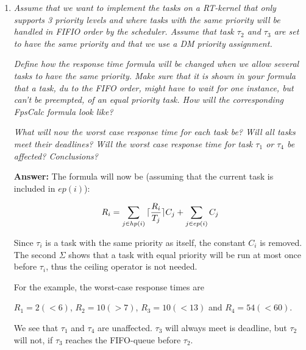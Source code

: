 \documentclass[a4paper,10pt]{article}
\DeclarePairedDelimiter{\ceil}{\lceil}{\rceil}
\newcommand{\answer}{\textbf{Answer: }}
\begin{document}
\begin{enumerate}
\begin{lstlisting}
	$R_1 = 2 (< 6)$, $R_2 = 10 (> 7)$, $R_3 = 7 (< 13)$ and $R_4 = 54 (< 60)$.
	The FpsCalc definition file used to calculate this is the same as the previous, except that the priorities have been exchanged as follows:

        \begin{lstlisting}
          Priovar[A] = 1;
          Priovar[B] = 3;
          Priovar[C] = 2;
          Priovar[D] = 4;
        \end{lstlisting}
	
	\item \emph{Assume that we want to implement the tasks on a RT-kernel that only supports 3 priority levels and where tasks with the same priority will be handled in FIFIO order by the scheduler. Assume that task $\tau_2$ and $\tau_3$ are set to have the same priority and that we use a DM priority assignment.}
	
	\emph{Define how the response time formula will be changed when we allow several tasks to have the same priority. Make sure that it is shown in your formula that a task, du to the FIFO order, might have to wait for one instance, but can't be preempted, of an equal priority task. How will the corresponding FpsCalc formula look like?}
	
	\emph{What will now the worst case response time for each task be? Will all tasks meet their deadlines? Will the worst case response time for task $\tau_1$ or $\tau_4$ be affected? Conclusions?}
	
	\answer The formula will now be (assuming that the current task is included in $ep(i)$):
	
	\begin{equation*}
		R_i = \sum_{j \in hp(i)}{\ceil{\frac{R_i}{T_j}}C_j} + \sum_{j \in ep(i)}{C_j}
	\end{equation*}
	
	Since $\tau_i$ is a task with the same priority as itself, the constant $C_i$ is removed. The second $\Sigma$ shows that a task with equal priority will be run at most once before $\tau_i$, thus the ceiling operator is not needed.
	
	For the example, the worst-case response times are
	
	$R_1 = 2 (< 6)$, $R_2 = 10 (> 7)$, $R_3 = 10 (< 13)$ and $R_4 = 54 (< 60)$.
	
	We see that $\tau_1$ and $\tau_4$ are unaffected. $\tau_3$ will always meet is deadline, but $\tau_2$ will not, if $\tau_3$ reaches the FIFO-queue before $\tau_2$.
	

\end{enumerate}
\end{document}
